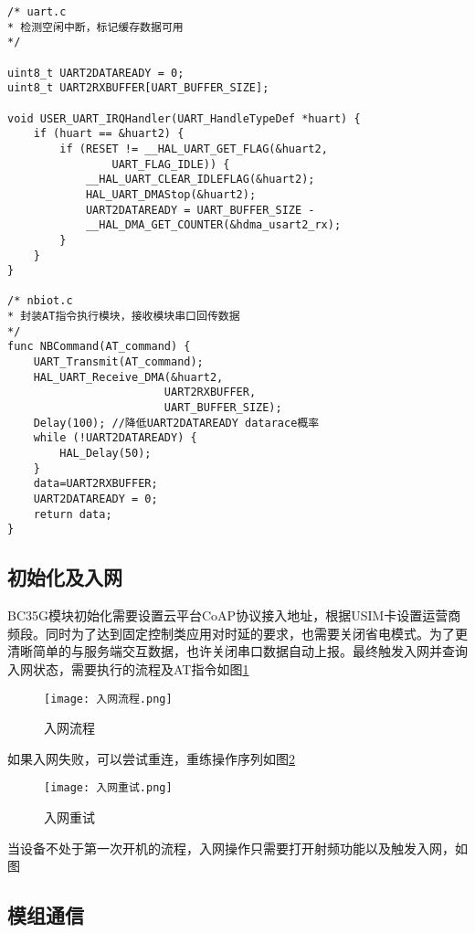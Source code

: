 \begin{lstlisting}
/* uart.c
* 检测空闲中断，标记缓存数据可用
*/

uint8_t UART2DATAREADY = 0;
uint8_t UART2RXBUFFER[UART_BUFFER_SIZE];

void USER_UART_IRQHandler(UART_HandleTypeDef *huart) {
    if (huart == &huart2) {
        if (RESET != __HAL_UART_GET_FLAG(&huart2, 
                UART_FLAG_IDLE)) {
            __HAL_UART_CLEAR_IDLEFLAG(&huart2);
            HAL_UART_DMAStop(&huart2);
            UART2DATAREADY = UART_BUFFER_SIZE - 
            __HAL_DMA_GET_COUNTER(&hdma_usart2_rx);
        }
    }
}

/* nbiot.c
* 封装AT指令执行模块，接收模块串口回传数据
*/
func NBCommand(AT_command) {
    UART_Transmit(AT_command);
    HAL_UART_Receive_DMA(&huart2, 
                        UART2RXBUFFER, 
                        UART_BUFFER_SIZE);
    Delay(100); //降低UART2DATAREADY datarace概率
    while (!UART2DATAREADY) {
        HAL_Delay(50);
    }
    data=UART2RXBUFFER;
    UART2DATAREADY = 0;
    return data;
}

\end{lstlisting}

\subsection{初始化及入网}
BC35G模块初始化需要设置云平台CoAP协议接入地址，根据USIM卡设置运营商频段。同时为了达到固定控制类应用对时延的要求，也需要关闭省电模式。为了更清晰简单的与服务端交互数据，也许关闭串口数据自动上报。最终触发入网并查询入网状态，需要执行的流程及AT指令如图\ref{入网流程}

\begin{figure}[H]
    \centering
	\texttt{[image: 入网流程.png]}
	\caption{入网流程}
	\label{入网流程}
\end{figure}


如果入网失败，可以尝试重连，重练操作序列如图\ref{入网重试}

\begin{figure}[H]
    \centering
	\texttt{[image: 入网重试.png]}
	\caption{入网重试}
	\label{入网重试}
\end{figure}

当设备不处于第一次开机的流程，入网操作只需要打开射频功能以及触发入网，如图

\subsection{模组通信}

